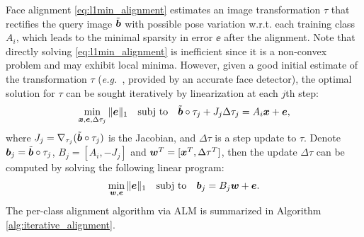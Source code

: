 \documentclass[preprint]{sigplanconf}
\def\eg{\emph{e.g.\ }}
\def\ie{\emph{i.e.\ }}
\begin{document}
Face alignment \eqref{eq:l1min_alignment} estimates an image transformation
$\tau$ that rectifies the query image $\tilde{{\boldsymbol{b}}}$ with possible pose
variation w.r.t. each training class $A_i$, which leads to the minimal sparsity
in error $\ee$ after the alignment. Note that directly solving
\eqref{eq:l1min_alignment} is inefficient since it is a non-convex problem
and may exhibit local minima.
However, given a good initial estimate of the
transformation $\tau$ (\eg, provided by an accurate face detector), the optimal
solution for $\tau$ can be sought iteratively by linearization at each $j$th
step:
\begin{equation}
\min_{{\boldsymbol{x}}, {\boldsymbol{e}}, \Delta \tau_j}\|{\boldsymbol{e}}\|_1\quad \textup{subj to}\quad \tilde{{\boldsymbol{b}}}\circ\tau_j +  J_j\Delta \tau_j = A_i{\boldsymbol{x}} + {\boldsymbol{e}},
\end{equation}
where $J_j = \nabla_{\tau_j}(\tilde{{\boldsymbol{b}}}\circ\tau_j)$ is the Jacobian, and
$\Delta \tau$ is a step update to $\tau$. Denote ${\boldsymbol{b}}_j =
\tilde{{\boldsymbol{b}}}\circ\tau_j$, $B_j = [A_i, -J_j]$ and ${\boldsymbol{w}}^T = [{\boldsymbol{x}}^T, \Delta
\tau^T]$, then the update $\Delta \tau$ can be computed by solving the
following linear program:
\begin{equation}
\min_{{\boldsymbol{w}}, {\boldsymbol{e}}}\|{\boldsymbol{e}}\|_1\quad \textup{subj to}\quad {\boldsymbol{b}}_j = B_j{\boldsymbol{w}} + {\boldsymbol{e}}.
\label{eq:alignment-linearization}
\end{equation}
The per-class alignment algorithm via ALM is summarized in Algorithm
\ref{alg:iterative_alignment}. 
\end{document}
